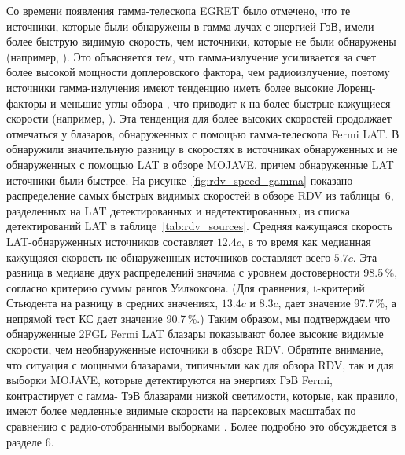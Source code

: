 Со времени появления гамма-телескопа EGRET было отмечено, что те источники, которые были обнаружены
в гамма-лучах с энергией ГэВ, имели более быструю видимую скорость, чем источники, которые не были
обнаружены (например, \cite{Jorstad_2001}). Это объясняется тем, что гамма-излучение усиливается за
счет более высокой мощности доплеровского фактора, чем радиоизлучение, поэтому источники
гамма-излучения имеют тенденцию иметь более высокие Лоренц-факторы и меньшие углы обзора
\cite{Pushkarev_2007}, что приводит к на более быстрые кажущиеся скорости (например,
\cite{Lister_1999}). Эта тенденция для более высоких скоростей продолжает отмечаться у блазаров,
обнаруженных с помощью гамма-телескопа Fermi LAT. В \cite{Lister_2009c} обнаружили значительную
разницу в скоростях в источниках обнаруженных и не обнаруженных с помощью LAT в обзоре MOJAVE,
причем обнаруженные LAT источники были быстрее. На рисунке~\ref{fig:rdv_speed_gamma} показано
распределение самых быстрых видимых скоростей в обзоре RDV из таблицы~6, разделенных на LAT
детектированных и недетектированных, из списка детектирований LAT в таблице~\ref{tab:rdv_sources}.
Средняя кажущаяся скорость LAT-обнаруженных источников составляет $12.4c$, в то время как медианная
кажущаяся скорость не обнаруженных источников составляет всего $5.7c$. Эта разница в медиане двух
распределений значима с уровнем достоверности 98.5\,\%, согласно критерию суммы рангов Уилкоксона.
(Для сравнения, t-критерий Стьюдента на разницу в средних значениях, $13.4c$ и $8.3c$, дает значение
97.7\,\%, а непрямой тест КС дает значение 90.7\,\%.) Таким образом, мы подтверждаем что
обнаруженные 2FGL Fermi LAT блазары показывают более высокие видимые скорости, чем необнаруженные
источники в обзоре RDV. Обратите внимание, что ситуация с мощными блазарами, типичными как для
обзора RDV, так и для выборки MOJAVE, которые детектируются на энергиях ГэВ Fermi, контрастирует с
гамма- ТэВ блазарами низкой светимости, которые, как правило, имеют более медленные видимые скорости
на парсековых масштабах по сравнению с радио-отобранными выборками \cite{Piner_2010}. Более подробно
это обсуждается в разделе 6.

